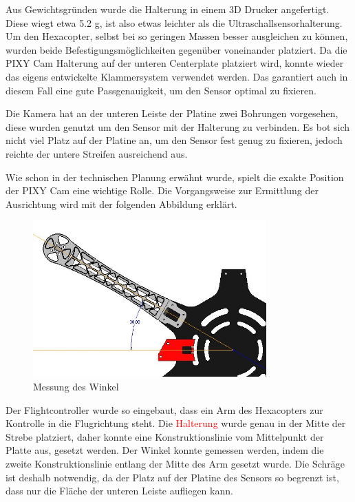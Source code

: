 	Aus Gewichtsgründen wurde die Halterung in einem 3D Drucker angefertigt.
	Diese wiegt etwa 5.2 g, ist also etwas leichter als die Ultraschallsensorhalterung.
	Um den Hexacopter, selbst bei so geringen Massen besser ausgleichen zu können, wurden beide Befestigungsmöglichkeiten gegenüber voneinander platziert.
	Da die PIXY Cam Halterung auf der unteren Centerplate platziert wird, konnte wieder das eigens entwickelte Klammersystem verwendet werden.
	Das garantiert auch in diesem Fall eine gute Passgenauigkeit, um den Sensor optimal zu fixieren.

			\newpage

	Die Kamera hat an der unteren Leiste der Platine zwei Bohrungen vorgesehen, diese wurden genutzt um den Sensor mit der Halterung zu verbinden.
	Es bot sich nicht viel Platz auf der Platine an, um den Sensor fest genug zu fixieren, jedoch reichte der untere Streifen ausreichend aus.

	Wie schon in der technischen Planung erwähnt wurde, spielt die exakte Position der PIXY Cam eine wichtige Rolle.
	Die Vorgangsweise zur Ermittlung der Ausrichtung wird mit der folgenden Abbildung erklärt.

			\begin{figure}[tbh]
			\begin{centering}
			\includegraphics[width = 0.8\textwidth]{Bilder/winkel_pixy}
			\par\end{centering}
			\caption{Messung des Winkel}
			\label{winkel_pixy}
			\end{figure}

	Der Flightcontroller wurde so eingebaut, dass ein Arm des Hexacopters zur Kontrolle in die Flugrichtung steht.
	Die \textcolor{red}{Halterung} wurde genau in der Mitte der Strebe platziert, daher konnte eine Konstruktionslinie vom Mittelpunkt der Platte aus, gesetzt werden.
	Der Winkel konnte gemessen werden, indem die zweite Konstruktionslinie entlang der Mitte des Arm gesetzt wurde.
	Die Schräge ist deshalb notwendig, da der Platz auf der Platine des Sensors so begrenzt ist, dass nur die Fläche der unteren Leiste aufliegen kann.

